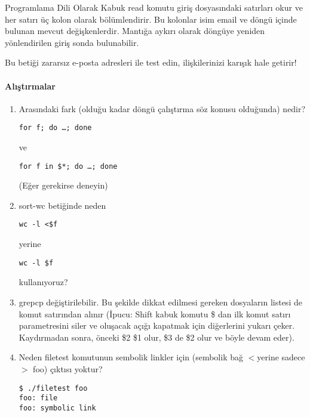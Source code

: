 \begin{section}{Programlama Dili Olarak Kabuk}
read komutu giriş dosyasındaki satırları okur ve her satırı üç kolon olarak bölümlendirir. Bu kolonlar isim email ve döngü içinde bulunan mevcut değişkenlerdir. Mantığa aykırı olarak döngüye yeniden yönlendirilen giriş sonda bulunabilir. 

Bu betiği zararsız e-posta adresleri ile test edin, ilişkilerinizi karışık hale getirir!

\paragraph{{\Huge{\PencilLeftDown}}Alıştırmalar}{
\begin{enumerate}
\item Arasındaki fark (olduğu kadar döngü çalıştırma söz konusu olduğunda) nedir?
\begin{verbatim}
for f; do …; done
\end{verbatim}
ve
\begin{verbatim}
for f in $*; do …; done
\end{verbatim}
(Eğer gerekirse deneyin)
\item sort-wc betiğinde neden
\begin{verbatim}
wc -l <$f
\end{verbatim}
yerine
\begin{verbatim}
wc -l $f
\end{verbatim}
kullanıyoruz?
\item grepcp değiştirilebilir. Bu şekilde dikkat edilmesi gereken dosyaların listesi de komut satırından alınır (İpucu: Shift kabuk komutu \$ dan ilk komut satırı parametresini siler ve oluşacak açığı kapatmak için diğerlerini yukarı çeker. Kaydırmadan sonra, önceki \$2 \$1 olur, \$3 de \$2 olur ve böyle devam eder).
\item Neden filetest komutunun sembolik linkler için (sembolik bağ $<$yerine sadece$>$ foo) çıktısı yoktur?
\begin{verbatim}
$ ./filetest foo
foo: file
foo: symbolic link
\end{verbatim}
\end{enumerate}
}
\end{section}
